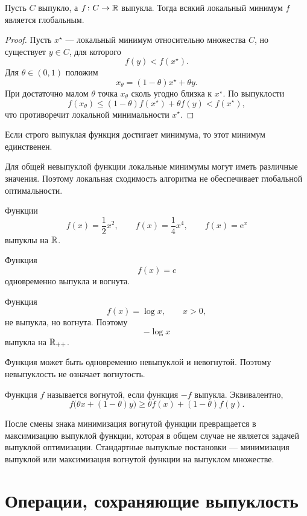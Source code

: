 \begin{theorem}
Пусть \(C\) выпукло, а \(f\colon C\to\mathbb{R}\) выпукла. Тогда всякий
локальный минимум \(f\) является глобальным.
\end{theorem}

\begin{proof}
Пусть \(x^\star\) --- локальный минимум относительно множества
\(C\), но существует \(y\in C\),
для которого
\[
    f(y)<f(x^\star).
\]
Для \(\theta\in(0,1)\) положим
\[
    x_\theta=(1-\theta)x^\star+\theta y.
\]
При достаточно малом \(\theta\) точка \(x_\theta\) сколь угодно
близка к \(x^\star\). По выпуклости
\[
    f(x_\theta)
    \le
    (1-\theta)f(x^\star)+\theta f(y)
    <
    f(x^\star),
\]
что противоречит локальной минимальности \(x^\star\).
\end{proof}

\begin{corollary}
Если строго выпуклая функция достигает минимума, то этот минимум
единственен.
\end{corollary}

Для общей невыпуклой функции локальные минимумы могут иметь различные
значения. Поэтому локальная сходимость алгоритма не обеспечивает
глобальной оптимальности.



Функции
\[
    f(x)=\frac12x^2,
    \qquad
    f(x)=\frac14x^4,
    \qquad
    f(x)=\mathrm{e}^x
\]
выпуклы на \(\mathbb{R}\).

Функция
\[
    f(x)=c
\]
одновременно выпукла и вогнута.

Функция
\[
    f(x)=\log x,
    \qquad x>0,
\]
не выпукла, но вогнута. Поэтому
\[
    -\log x
\]
выпукла на \(\mathbb{R}_{++}\).

Функция может быть одновременно невыпуклой и невогнутой. Поэтому
невыпуклость не означает вогнутость.

\begin{definition}
Функция \(f\) называется вогнутой, если функция \(-f\) выпукла.
Эквивалентно,
\[
    f\bigl(\theta x+(1-\theta)y\bigr)
    \ge
    \theta f(x)+(1-\theta)f(y).
\]
\end{definition}

После смены знака минимизация вогнутой функции превращается в
максимизацию выпуклой функции, которая в общем случае не является
задачей выпуклой оптимизации. Стандартные выпуклые постановки ---
минимизация выпуклой или максимизация вогнутой функции на выпуклом
множестве.

\section{Операции, сохраняющие выпуклость}




